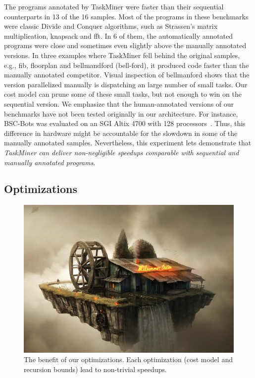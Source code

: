 \documentclass[sigplan,10pt,review,anonymous]{acmart}
\newcommand\Taskminer{\mbox{\textsf{TaskMiner}}}
\begin{document}
The programs annotated by \Taskminer{} were faster than their sequential
counterparts in 13 of the 16 samples.
Most of the programs in these benchmarks were classic Divide and Conquer algorithms, such as \textsf{Strassen}'s matrix multiplication, \textsf{knapsack}
and \textsf{fft}.
In 6 of them, the automatically annotated programs were close and sometimes even 
slightly above the manually annotated versions.
In three examples where \Taskminer{} fell behind the original samples, e.g.,
\textsf{fib}, \textsf{floorplan} and \textsf{bellmandford} (\textsf{bell-ford}),
it produced code faster than the manually annotated competitor.
Visual inspection of \textsf{bellmanford} shows that the version parallelized
manually is dispatching an large number of small tasks.
Our cost model can prune some of these small tasks, but not enough to win
on the sequential version.
We emphasize that the human-annotated versions of our benchmarks have not
been tested originally in our architecture.
For instance, \textsf{BSC-Bots} was evaluated on an SGI Altix 4700
with 128 processors~\cite{Duran09}.
Thus, this difference in hardware might be accountable for the slowdown in
some of the manually annotated samples.
Nevertheless, this experiment lets demonstrate that {\em \Taskminer{} can
deliver non-negligible speedups comparable with sequential and manually
annotated programs}.

\subsection{Optimizations}
\label{sub:optimizations}

\begin{figure}[htb]
\begin{center}
\includegraphics[width=1\columnwidth]{images/Stub}
\caption{The benefit of our optimizations.
Each optimization (cost model and recursion bounds) lead to
non-trivial speedups.}
\label{fig:Opt_Speedups}
\end{center}
\end{figure}
\end{document}
